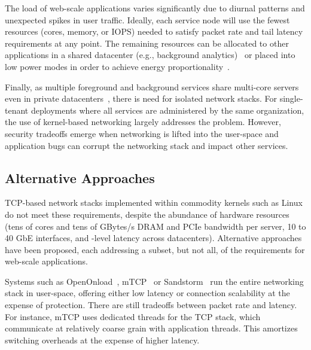  The load of web-scale applications
varies significantly due to diurnal patterns and unexpected spikes in
user traffic. Ideally, each service node will use the fewest
resources (cores, memory, or IOPS) needed to satisfy packet rate
and tail latency requirements at any point. The remaining
resources can be allocated to other applications in a shared
datacenter (e.g., background
analytics)~\cite{Hindman:2011:MPF,DBLP:conf/asplos/DelimitrouK14,Leverich:RHSU:2014}
or placed into low power modes in order to achieve energy
proportionality~\cite{DBLP:journals/computer/BarrosoH07, Lo:2014:TWE}.

 Finally, as multiple foreground and
background services share multi-core servers even in private
datacenters~\cite{Hindman:2011:MPF,Schwarzkopf:2013:OFS,DBLP:journals/cacm/DeanB13},
there is need for isolated network stacks. For single-tenant
deployments where all services are administered by the same
organization, the use of kernel-based networking largely addresses the
problem.  However, security tradeoffs emerge when networking is lifted into the
user-space and application bugs can corrupt the networking stack and
impact other services.


\subsection{Alternative Approaches}
\label{sec:motivation:current}

TCP-based network stacks implemented within commodity kernels such as
Linux do not meet these requirements, despite the abundance of hardware
resources (tens of cores and tens of GBytes/s DRAM and PCIe
bandwidth per server, 10 to 40 GbE interfaces, and \microsecond-level
latency across datacenters).
Alternative approaches have been proposed, each addressing a subset,
but not all, of
the requirements for web-scale applications. %

 Systems such as
OpenOnload~\cite{openonload}, mTCP~\cite{jeong2014mtcp} or
Sandstorm~\cite{marinos2013network} run the entire networking stack in
user-space, offering either low latency or connection scalability at
the expense of protection. There are still tradeoffs between packet
rate and latency. For instance, mTCP uses dedicated threads for the
TCP stack, which communicate at relatively coarse grain with
application threads. This amortizes switching overheads at the expense
of higher latency.

